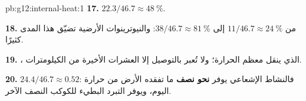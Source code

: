 \begin{solution}{pb:g12:internal-heat:1}
\textbf{17.} $22.3/46.7 \approx \qty{48}{\percent}$.

\textbf{18.} من $11/46.7 \approx \qty{24}{\percent}$ إلى $38/46.7 \approx
\qty{81}{\percent}$: والنيوترينوات الأرضية تضيّق هذا المدى كثيرًا.

\textbf{19.} ، الذي ينقل معظم الحرارة؛ ولا تُعبر بالتوصيل
إلا العشرات الأخيرة من الكيلومترات.

\textbf{20.} $24.4/46.7 \approx 0.52$: فالنشاط الإشعاعي يوفر
\textbf{نحو نصف} ما تفقده الأرض من حرارة اليوم، ويوفر التبرد البطيء
للكوكب النصف الآخر.
\end{solution}
